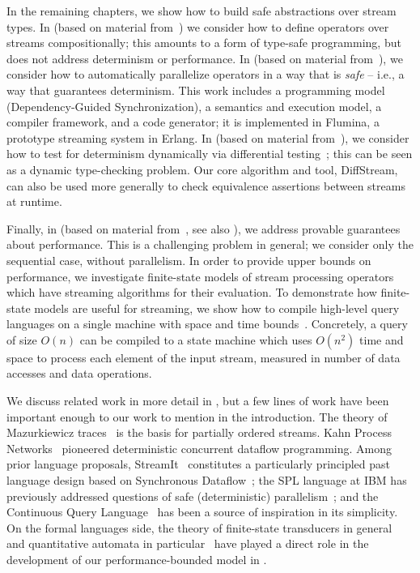 In the remaining chapters, we show how to build safe abstractions over stream types.
In  (based on material from~) we consider how to define operators over streams compositionally; this amounts to a form of type-safe programming, but does not address determinism or performance.
In  (based on material from~), we consider how to automatically parallelize operators in a way that is \emph{safe} -- i.e., a way that guarantees determinism. This work includes a programming model (Dependency-Guided Synchronization), a semantics and execution model, a compiler framework, and a code generator; it is implemented in Flumina, a prototype streaming system in Erlang.
In  (based on material from~), we
consider how to test for determinism dynamically via differential testing~\cite{mckeeman1998differential}; this can be seen as a dynamic
type-checking problem. Our core algorithm and tool, DiffStream, can also be used more generally to check equivalence assertions between streams at runtime.

Finally, in  (based on material from~, see also ), we address provable guarantees about performance. This is a challenging problem in general; we consider only the sequential case, without parallelism. In order to provide upper bounds on performance, we investigate finite-state models of stream processing operators which have streaming algorithms for their evaluation. To demonstrate how finite-state models are useful for streaming, we show how to compile high-level query languages on a single machine with space and time bounds~\cite{QRE,StreamQRE}. Concretely, a query of size $O(n)$ can be compiled to a state machine which uses $O(n^2)$ time and space to process each element of the input stream, measured in number of data accesses and data operations.

We discuss related work in more detail in , but a few lines of work have been important enough to our work to mention in the introduction.
The theory of Mazurkiewicz traces~\cite{mazurkiewicz1986trace,DiekertR1995} is the basis for partially ordered streams.
Kahn Process Networks~\cite{gilles1974semantics} pioneered deterministic concurrent dataflow programming.
Among prior language proposals, StreamIt~\cite{thies2002streamit} constitutes a particularly principled past language design based on Synchronous Dataflow~\cite{lee1987synchronous};
the SPL language at IBM has previously addressed questions of safe (deterministic) parallelism~\cite{HAG2013SPL,schneider2013safe,hirzel2014catalog};
and the Continuous Query Language~\cite{arasu2003cql,ABW2006CQL} has been a source of inspiration in its simplicity.
On the formal languages side, the theory of finite-state transducers in general~\cite{EH2001MDST,AC2010SST}
and quantitative automata in particular~\cite{S1961WA,DKV2009HWA,AdADRY2013CRA}
have played a direct role in the development of our performance-bounded
model in .

